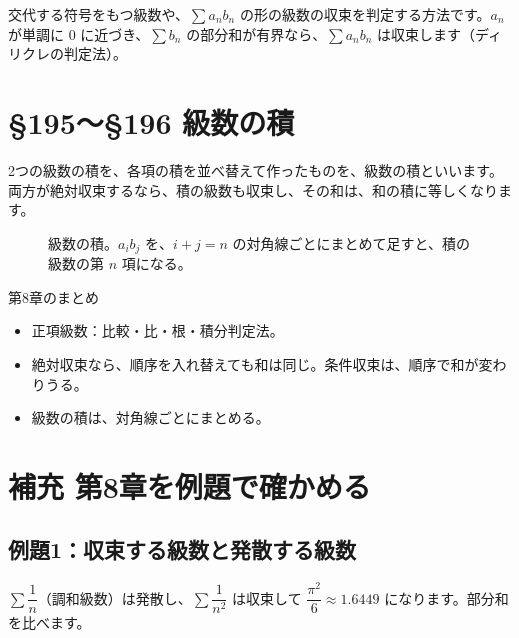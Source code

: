 \documentclass[a4paper,11pt,openany]{ltjsbook}
\begin{document}
交代する符号をもつ級数や、$\sum a_nb_n$ の形の級数の収束を判定する方法です。$a_n$ が単調に $0$ に近づき、$\sum b_n$ の部分和が有界なら、$\sum a_nb_n$ は収束します（ディリクレの判定法）。

\section{§195〜§196 級数の積}

2つの級数の積を、各項の積を並べ替えて作ったものを、級数の積といいます。両方が絶対収束するなら、積の級数も収束し、その和は、和の積に等しくなります。

\begin{figure}[htbp]
\centering
{}
\caption{級数の積。$a_ib_j$ を、$i+j=n$ の対角線ごとにまとめて足すと、積の級数の第 $n$ 項になる。}
\end{figure}

\begin{pointbox}{第8章のまとめ}
\begin{itemize}[leftmargin=1.5em]
\item 正項級数：比較・比・根・積分判定法。
\item 絶対収束なら、順序を入れ替えても和は同じ。条件収束は、順序で和が変わりうる。
\item 級数の積は、対角線ごとにまとめる。
\end{itemize}
\end{pointbox}

\section{補充 第8章を例題で確かめる}

\subsection*{例題1：収束する級数と発散する級数}

$\sum\dfrac1n$（調和級数）は発散し、$\sum\dfrac1{n^2}$ は収束して $\dfrac{\pi^2}{6}\approx1.6449$ になります。部分和を比べます。
\end{document}

